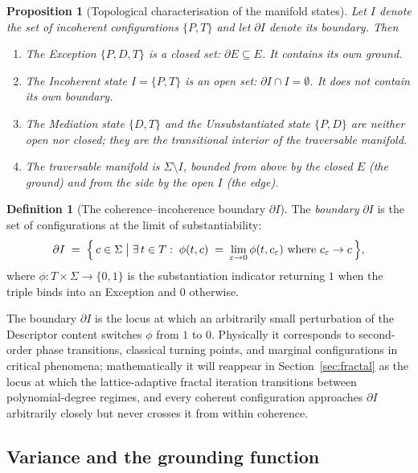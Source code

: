 \documentclass[11pt,a4paper]{article}
\newtheorem{proposition}[theorem]{Proposition}
\theoremstyle{definition}
\newtheorem{definition}[theorem]{Definition}
\theoremstyle{remark}
\newcommand{\eps}{\varepsilon}
\begin{document}
\begin{proposition}[Topological characterisation of the manifold states]\label{prop:topology}
Let $I$ denote the set of incoherent configurations $\{P,T\}$ and let $\partial I$ denote its boundary. Then
\begin{enumerate}[label=(\roman*),leftmargin=*]
\item The Exception $\{P,D,T\}$ is a closed set: $\partial E \subseteq E$. It contains its own ground.
\item The Incoherent state $I = \{P,T\}$ is an open set: $\partial I \cap I = \emptyset$. It does not contain its own boundary.
\item The Mediation state $\{D,T\}$ and the Unsubstantiated state $\{P,D\}$ are neither open nor closed; they are the transitional interior of the traversable manifold.
\item The traversable manifold is $\Sigma \setminus I$, bounded from above by the closed $E$ (the ground) and from the side by the open $I$ (the edge).
\end{enumerate}
\end{proposition}

\begin{definition}[The coherence--incoherence boundary $\partial I$]\label{def:dI}
The \emph{boundary} $\partial I$ is the set of configurations at the limit of substantiability:
\[
\partial I \;=\; \Bigl\{\, c \in \Sigma \;\big|\; \exists\, t\in T :\; \phi(t,c) \;=\; \lim_{\eps\to 0}\phi(t, c_{\eps})\text{ where }c_{\eps}\to c \,\Bigr\},
\]
where $\phi : T \times \Sigma \to \{0,1\}$ is the substantiation indicator returning $1$ when the triple binds into an Exception and $0$ otherwise.
\end{definition}

The boundary $\partial I$ is the locus at which an arbitrarily small perturbation of the Descriptor content switches $\phi$ from $1$ to $0$. Physically it corresponds to second-order phase transitions, classical turning points, and marginal configurations in critical phenomena; mathematically it will reappear in Section~\ref{sec:fractal} as the locus at which the lattice-adaptive fractal iteration transitions between polynomial-degree regimes, and every coherent configuration approaches $\partial I$ arbitrarily closely but never crosses it from within coherence.

\subsection{Variance and the grounding function}\label{subsec:variance}
\end{document}
